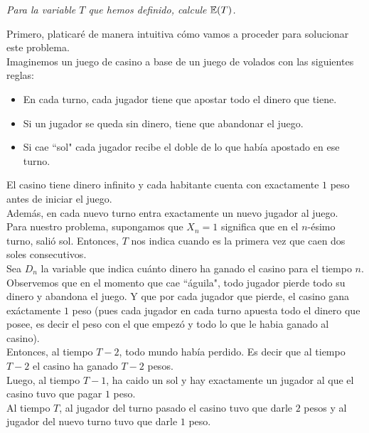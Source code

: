 \emph
{
	Para la variable $T$ que hemos definido, calcule $\mathbb{E}\! \left( T \right)$.\\
}

	Primero, platicaré de manera intuitiva cómo vamos a proceder para solucionar este problema.\\

	Imaginemos un juego de casino a base de un juego de volados con las siguientes reglas:\\
	\begin{itemize}
			\item En cada turno, cada jugador tiene que apostar todo el dinero que tiene.
			\item Si un jugador se queda sin dinero, tiene que abandonar el juego.
			\item Si cae ``sol" cada jugador recibe el doble de lo que había apostado en ese turno.  
	\end{itemize}
   
	\;El casino tiene dinero infinito y cada habitante cuenta con exactamente $1$ peso antes de
	iniciar el juego.\\
   
	Además, en cada nuevo turno entra exactamente un nuevo jugador al juego.\\
   
	Para nuestro problema, supongamos que $X_n = 1$ significa que en el $n$-ésimo turno, salió sol.
	Entonces, $T$ nos indica cuando es la primera vez que caen dos soles consecutivos.\\
   
	Sea $D_n$ la variable que indica cuánto dinero ha ganado el casino para el tiempo $n$.\\
   
	Observemos que en el momento que cae ``águila", todo jugador pierde todo su dinero y abandona el juego.
	Y que por cada jugador que pierde, el casino gana exáctamente $1$ peso (pues cada jugador en cada
	turno apuesta todo el dinero que posee, es decir el peso con el que empezó y todo lo que le habia
	ganado al casino).\\
   
	Entonces, al tiempo $T-2$, todo mundo había perdido. Es decir que al tiempo $T-2$ el casino ha ganado
	$T-2$ pesos.\\
   
	Luego, al tiempo $T-1$, ha caido un sol y hay exactamente un jugador al que el casino tuvo 
	que pagar $1$ peso.\\
   
	Al tiempo $T$, al jugador del turno pasado el casino tuvo que darle $2$ pesos y al jugador del nuevo
	turno tuvo que darle $1$ peso.\\
   

